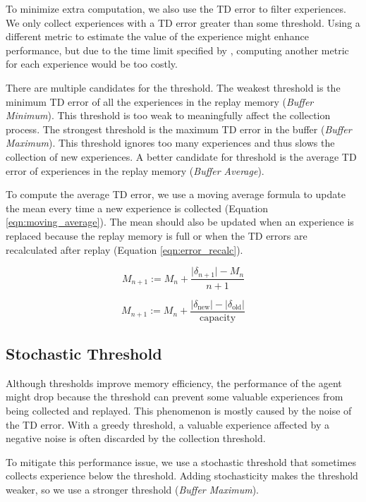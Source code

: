 \documentclass{article} %
\begin{document}
To minimize extra computation, we also use the TD error to filter experiences. We only collect experiences with a TD error greater than some threshold. Using a different metric to estimate the value of the experience might enhance performance, but due to the time limit specified by \cite{Retro}, computing another metric for each experience would be too costly.

There are multiple candidates for the threshold. The weakest threshold is the minimum TD error of all the experiences in the replay memory (\textit{Buffer Minimum}). This threshold is too weak to meaningfully affect the collection process. The strongest threshold is the maximum TD error in the buffer (\textit{Buffer Maximum}). This threshold ignores too many experiences and thus slows the collection of new experiences. A better candidate for threshold is the average TD error of experiences in the replay memory (\textit{Buffer Average}).

To compute the average TD error, we use a moving average formula to update the mean every time a new experience is collected (Equation \ref{eqn:moving_average}). The mean should also be updated when an experience is replaced because the replay memory is full or when the TD errors are recalculated after replay (Equation \ref{eqn:error_recalc}).

\begin{equation}
\label{eqn:moving_average}
M_{n+1} := M_n + \frac{\lvert \delta_{n+1} \rvert - M_n}{n+1}
\end{equation}

\begin{equation}
\label{eqn:error_recalc}
M_{n+1} := M_n + \frac{\lvert \delta_{\text{new}} \rvert - \lvert \delta_{\text{old}} \rvert}{\text{capacity}}
\end{equation}

\subsection{Stochastic Threshold}
Although thresholds improve memory efficiency, the performance of the agent might drop because the threshold can prevent some valuable experiences from being collected and replayed. This phenomenon is mostly caused by the noise of the TD error. With a greedy threshold, a valuable experience affected by a negative noise is often discarded by the collection threshold. 

To mitigate this performance issue, we use a stochastic threshold that sometimes collects experience below the threshold. Adding stochasticity makes the threshold weaker, so we use a stronger threshold (\textit{Buffer Maximum}).
\end{document}
